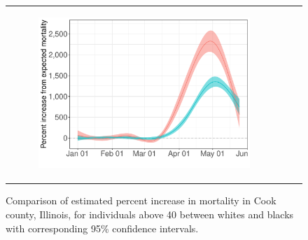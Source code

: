 \documentclass[11pt]{article}
\begin{document}
\begin{figure}[ht]
\begin{tabular}{lll}
\begin{subfigure}[t]{0.3\linewidth}
		\includegraphics[width=1\linewidth]{figs/figure-3c.pdf}
	\end{subfigure}\\
	\end{tabular}
	\caption{Comparison of estimated percent increase in mortality in Cook county, Illinois, for individuals above 40 between whites and blacks with corresponding 95\% confidence intervals.}
	\label{fig:cook-white-v-black}
\end{figure}
\end{document}
